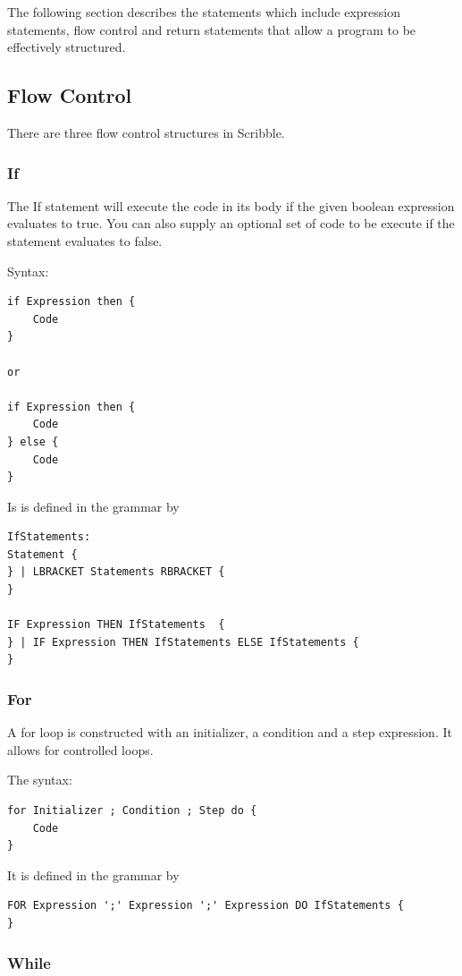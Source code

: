 \documentclass[]{final_report}
\begin{document}
The following section describes the statements which include expression statements, flow control and return statements that allow a program to be effectively structured.

\subsection{Flow Control}

There are three flow control structures in Scribble.

\subsubsection{If}

The If statement will execute the code in its body if the given boolean expression evaluates to true. You can also supply an optional set of code to be execute if the statement evaluates to false.

Syntax: 
\begin{verbatim}
if Expression then {
	Code
}

or

if Expression then {
	Code
} else {
	Code
}
\end{verbatim}

Is is defined in the grammar by
\begin{verbatim}
IfStatements: 
Statement {
} | LBRACKET Statements RBRACKET {
}

IF Expression THEN IfStatements  {
} | IF Expression THEN IfStatements ELSE IfStatements {
}
\end{verbatim}

\subsubsection{For}

A for loop is constructed with an initializer, a condition and a step expression. It allows for controlled loops.

The syntax: \begin{verbatim}
for Initializer ; Condition ; Step do {
	Code
}
\end{verbatim}

It is defined in the grammar by \begin{verbatim}
FOR Expression ';' Expression ';' Expression DO IfStatements {
}
\end{verbatim}

\subsubsection{While}
\end{document}

